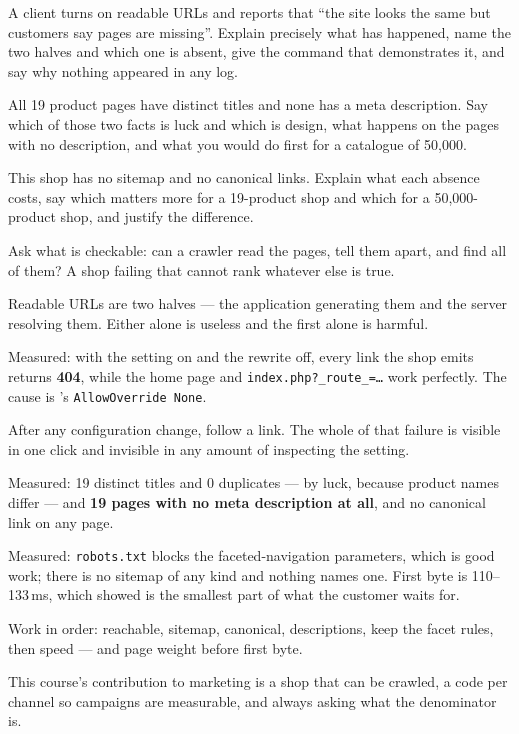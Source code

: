 \begin{checkpoint}
\begin{tightnum}
  \item A client turns on readable URLs and reports that ``the site looks the
        same but customers say pages are missing''. Explain precisely what has
        happened, name the two halves and which one is absent, give the command
        that demonstrates it, and say why nothing appeared in any log.
  \item All 19 product pages have distinct titles and none has a meta
        description. Say which of those two facts is luck and which is design,
        what happens on the pages with no description, and what you would do
        first for a catalogue of 50{,}000.
  \item This shop has no sitemap and no canonical links. Explain what each
        absence costs, say which matters more for a 19-product shop and which
        for a 50{,}000-product shop, and justify the difference.
\end{tightnum}
\end{checkpoint}

\begin{chaptersummary}
\begin{tight}
  \item Ask what is checkable: can a crawler read the pages, tell them apart,
        and find all of them? A shop failing that cannot rank whatever else is
        true.
  \item Readable URLs are two halves --- the application generating them and
        the server resolving them. Either alone is useless and the first alone
        is harmful.
  \item Measured: with the setting on and the rewrite off, every link the shop
        emits returns \textbf{404}, while the home page and
        \texttt{index.php?\_route\_=\dots} work perfectly. The cause is
        's \texttt{AllowOverride None}.
  \item After any configuration change, follow a link. The whole of that
        failure is visible in one click and invisible in any amount of
        inspecting the setting.
  \item Measured: 19 distinct titles and 0 duplicates --- by luck, because
        product names differ --- and \textbf{19 pages with no meta description
        at all}, and no canonical link on any page.
  \item Measured: \texttt{robots.txt} blocks the faceted-navigation parameters,
        which is good work; there is no sitemap of any kind and nothing names
        one. First byte is 110--133\,ms, which  showed is the
        smallest part of what the customer waits for.
  \item Work in order: reachable, sitemap, canonical, descriptions, keep the
        facet rules, then speed --- and page weight before first byte.
  \item This course's contribution to marketing is a shop that can be crawled,
        a code per channel so campaigns are measurable, and always asking what
        the denominator is.
\end{tight}
\end{chaptersummary}

